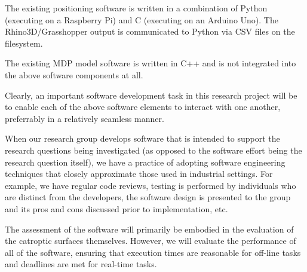 The existing positioning software is written in a combination of
Python (executing on a Raspberry Pi) and C (executing on an Arduino Uno).
The Rhino3D/Grasshopper output is communicated to Python via CSV
files on the filesystem.

The existing MDP model software is written in C++ and is not integrated
into the above software components at all.

Clearly, an important software development task in this research project
will be to enable each of the above software elements to interact with one
another, preferrably in a relatively seamless manner.

When our research group develops software that is intended to support
the research questions being investigated (as opposed to the software
effort being the research question itself), we have a practice of adopting
software engineering techniques that closely approximate those used
in industrial settings.  For example, we have regular code reviews,
testing is performed by individuals who are distinct from the developers,
the software design is presented to the group and its pros and cons
discussed prior to implementation, etc.

The assessment of the software will primarily be embodied in the evaluation
of the catroptic surfaces themselves.  However, we will evaluate the
performance of all of the software, ensuring that execution times are
reasonable for off-line tasks and deadlines are met for real-time tasks.
